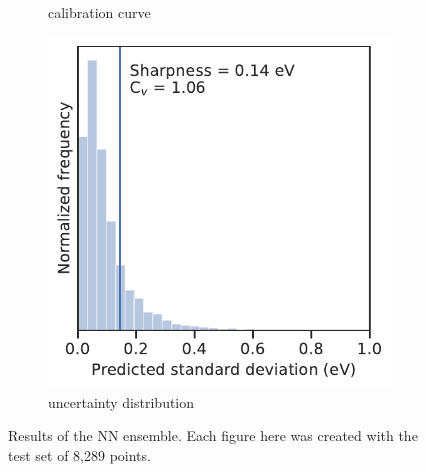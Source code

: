 \documentclass[]{achemso}
\begin{document}
\begin{figure}
\begin{subfigure}[b]{0.32\textwidth}
        \caption{calibration curve}\label{fig:calibration_example}
    \end{subfigure}
    \begin{subfigure}[b]{0.32\textwidth}
        \includegraphics[width=\textwidth]{../NN_ensemble/sharpness.pdf}
        \caption{uncertainty distribution}\label{fig:sharpness_example}
    \end{subfigure}
    \caption{Results of the \gls{NN} ensemble. Each figure here was created with the test set of 8,289 points.}\label{fig:results_example}
\end{figure}
\end{document}
